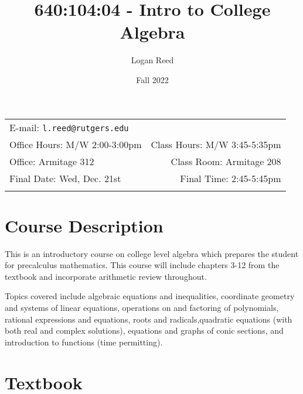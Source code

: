 \documentclass[11pt]{article}
\title{640:104:04 - Intro to College Algebra}
\author{Logan Reed}
\date{Fall 2022}
\newcommand{\blankline}{\quad\pagebreak[2]}
\begin{document}
\maketitle

\blankline

\begin{tabular*}{.93\textwidth}{@{\extracolsep{\fill}}lr}


E-mail: \texttt{l.reed@rutgers.edu} 
\\

 Office Hours: M/W 2:00-3:00pm  &  Class Hours: M/W 3:45-5:35pm \\

 Office: Armitage 312 & Class Room: Armitage 208 \\
 
Final Date: Wed, Dec. 21st  & Final Time: 2:45-5:45pm \\
&  \\
\hline
\end{tabular*}

\vspace{5 mm}


\section*{Course Description}

This is an introductory course on college level algebra which prepares
the student for precalculus mathematics. This course will include
chapters 3-12 from the textbook and incorporate arithmetic review
throughout.

\bigskip

\noindent Topics covered include algebraic equations and
inequalities, coordinate geometry and systems of linear equations,
operations on and factoring of polynomials, rational expressions and
equations, roots and radicals,quadratic equations (with both real and
complex solutions), equations and graphs of conic sections, and
introduction to functions (time permitting).


\section*{Textbook}
\end{document}
